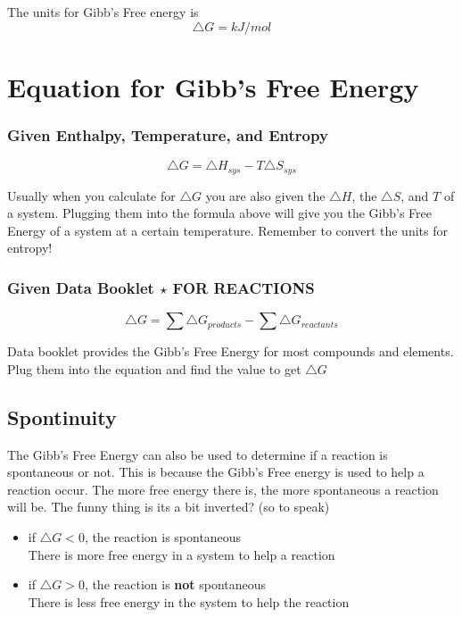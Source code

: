 \documentclass[12pt]{article}
\begin{document}
The units for Gibb's Free energy is 
$$\triangle{G} = kJ/mol$$

\section{Equation for Gibb's Free Energy}

\subsubsection{Given Enthalpy, Temperature, and Entropy}

$$\triangle{G} = \triangle{H}_{sys} - T\triangle{S}_{sys}$$

Usually when you calculate for $\triangle{G}$ you are also given the $\triangle{H}$, the $\triangle{S}$, and $T$ of a system. Plugging them into the formula above will give you the Gibb's Free Energy of a system at a certain temperature. Remember to convert the units for entropy!

\subsubsection{Given Data Booklet $\star$ \textbf{FOR REACTIONS}}

$$\triangle{G} = \sum{\triangle{G}_{products}} - \sum{\triangle{G}_{reactants}}$$

Data booklet provides the Gibb's Free Energy for most compounds and elements. Plug them into the equation and find the value to get $\triangle{G}$

\subsection{Spontinuity}

The Gibb's Free Energy can also be used to determine if a reaction is spontaneous or not. This is because the Gibb's Free energy is used to help a reaction occur. The more free energy there is, the more spontaneous a reaction will be. The funny thing is its a bit inverted? (so to speak)

\begin{itemize}
\item if $\triangle{G} < 0$, the reaction is spontaneous\\There is more free energy in a system to help a reaction
\item if $\triangle{G} > 0$, the reaction is \textbf{not} spontaneous\\There is less free energy in the system to help the reaction
\end{itemize}
\end{document}
